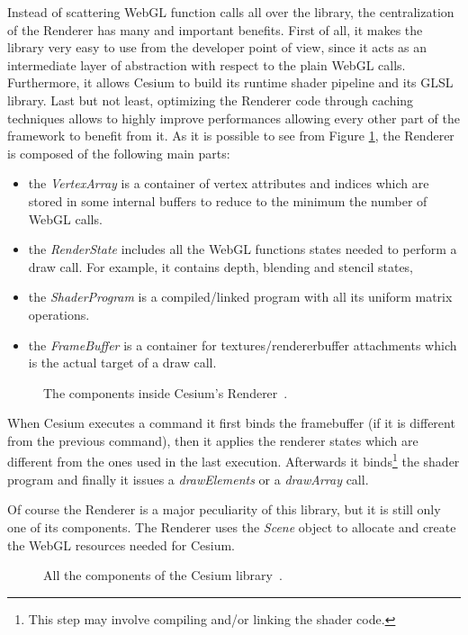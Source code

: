 Instead of scattering WebGL function calls all over the library, the centralization
of the Renderer has many and important benefits. First of all, it makes the
library very easy to use from the developer point of view, since it acts as an
intermediate layer of abstraction with respect to the plain WebGL calls. Furthermore,
it allows Cesium to build its runtime shader pipeline and its GLSL library. Last
but not least, optimizing the Renderer code through caching techniques allows
to highly improve performances allowing every other part of the framework to
benefit from it. As it is possible to see from Figure \ref{img:cesium_renderer},
the Renderer is composed of the following main parts:
\begin{itemize}
    \item the \emph{VertexArray} is a container of vertex attributes and indices
        which are stored in some internal buffers to reduce to the minimum the
        number of WebGL calls.
    \item the \emph{RenderState} includes all the WebGL functions states needed to
        perform a draw call. For example, it contains depth, blending and stencil
        states,
    \item the \emph{ShaderProgram} is a compiled/linked program with all its
        uniform matrix operations.
    \item the \emph{FrameBuffer} is a container for textures/rendererbuffer
        attachments which is the actual target of a draw call.
\end{itemize}

\begin{figure}[!htb]
    \caption{The components inside Cesium's Renderer~\cite{fig_cesium_renderer}.}
    \label{img:cesium_renderer}
\end{figure}

When Cesium executes a command it first binds the framebuffer (if it is different
from the previous command), then it applies the renderer states which are different
from the ones used in the last execution. Afterwards it binds\footnote{This step may
involve compiling and/or linking the shader code.} the shader program and finally it
issues a \emph{drawElements} or a \emph{drawArray} call.

Of course the Renderer is a major peculiarity of this library, but it is still only
one of its components. The Renderer uses the \emph{Scene} object to allocate and
create the WebGL resources needed for Cesium.
\begin{figure}[!htb]
    \caption{All the components of the Cesium library~\cite{fig_cesium_renderer}.}
    \label{img:cesium_stack}
\end{figure}

